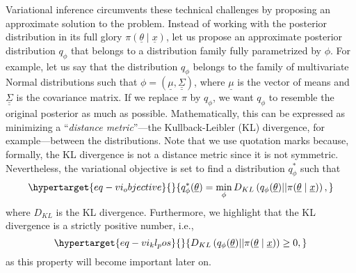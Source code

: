 \documentclass[
  letterpaper,
  DIV=11,
  numbers=noendperiod]{scrartcl}
\begin{document}
\begin{refsegment}
Variational inference circumvents these technical challenges by
proposing an approximate solution to the problem. Instead of working
with the posterior distribution in its full glory
\(\pi(\underline{\theta} \mid \underline{x})\), let us propose an
approximate posterior distribution \(q_\phi\) that belongs to a
distribution family fully parametrized by \(\phi\). For example, let us
say that the distribution \(q_\phi\) belongs to the family of
multivariate Normal distributions such that
\(\phi = (\underline{\mu}, \underline{\underline{\Sigma}})\), where
\(\underline{\mu}\) is the vector of means and
\(\underline{\underline{\Sigma}}\) is the covariance matrix. If we
replace \(\pi\) by \(q_\phi\), we want \(q_\phi\) to resemble the
original posterior as much as possible. Mathematically, this can be
expressed as minimizing a ``\emph{distance metric}''---the
Kullback-Leibler (KL) divergence, for example---between the
distributions. Note that we use quotation marks because, formally, the
KL divergence is not a distance metric since it is not symmetric.
Nevertheless, the variational objective is set to find a distribution
\(q_\phi^*\) such that
\begin{equation}\protect\hypertarget{eq-vi_objective}{}{
q_\phi^*(\underline{\theta}) =
\min_\phi D_{KL}\left(
    q_\phi(\underline{\theta}) \vert\vert 
    \pi(\underline{\theta} \mid \underline{x})
\right),
}\label{eq-vi_objective}\end{equation} where \(D_{KL}\) is the KL
divergence. Furthermore, we highlight that the KL divergence is a
strictly positive number, i.e.,
\begin{equation}\protect\hypertarget{eq-vi_kl_pos}{}{
D_{KL}\left(
    q_\phi(\underline{\theta}) \vert\vert 
    \pi(\underline{\theta} \mid \underline{x})
\right) \geq 0,
}\label{eq-vi_kl_pos}\end{equation} as this property will become
important later on.


\end{refsegment}
\end{document}

